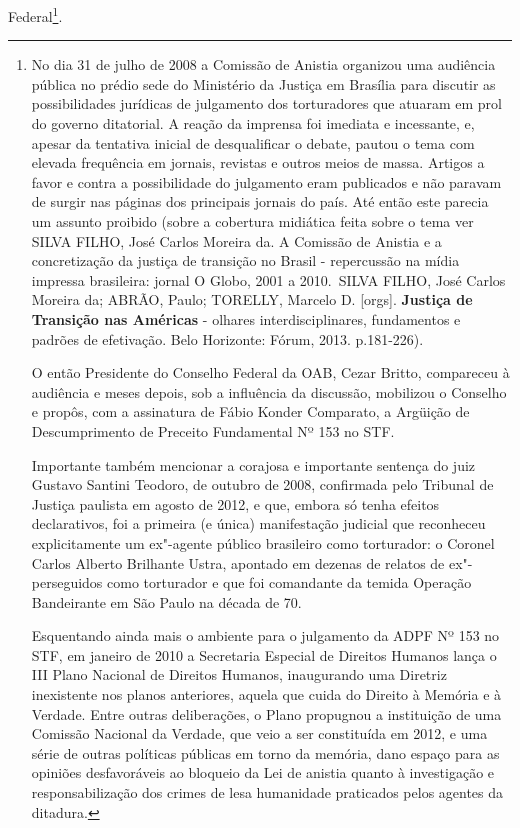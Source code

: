 Federal\footnote{No dia 31 de julho de 2008 a Comissão de Anistia
  organizou uma audiência pública no prédio sede do Ministério da
  Justiça em Brasília para discutir as possibilidades jurídicas de
  julgamento dos torturadores que atuaram em prol do governo ditatorial.
  A reação da imprensa foi imediata e incessante, e, apesar da tentativa
  inicial de desqualificar o debate, pautou o tema com elevada
  frequência em jornais, revistas e outros meios de massa. Artigos a
  favor e contra a possibilidade do julgamento eram publicados e não
  paravam de surgir nas páginas dos principais jornais do país. Até
  então este parecia um assunto proibido (sobre a cobertura midiática
  feita sobre o tema ver SILVA FILHO, José Carlos Moreira da. A Comissão
  de Anistia e a concretização da justiça de transição no Brasil -
  repercussão na mídia impressa brasileira: jornal O Globo, 2001 a
  2010.~SILVA FILHO, José Carlos Moreira da; ABRÃO, Paulo; TORELLY,
  Marcelo D. {[}orgs{]}. \textbf{Justiça de Transição nas Américas} -
  olhares interdisciplinares, fundamentos e padrões de efetivação. Belo
  Horizonte: Fórum, 2013. p.181-226).

  O então Presidente do Conselho Federal da OAB, Cezar Britto,
  compareceu à audiência e meses depois, sob a influência da discussão,
  mobilizou o Conselho e propôs, com a assinatura de Fábio Konder
  Comparato, a Argüição de Descumprimento de Preceito Fundamental Nº 153
  no STF.

  Importante também mencionar a corajosa e importante sentença do juiz
  Gustavo Santini Teodoro, de outubro de 2008, confirmada pelo Tribunal
  de Justiça paulista em agosto de 2012, e que, embora só tenha efeitos
  declarativos, foi a primeira (e única) manifestação judicial que
  reconheceu explicitamente um ex"-agente público brasileiro como
  torturador: o Coronel Carlos Alberto Brilhante Ustra, apontado em
  dezenas de relatos de ex"-perseguidos como torturador e que foi
  comandante da temida Operação Bandeirante em São Paulo na década de
  70.

  Esquentando ainda mais o ambiente para o julgamento da ADPF Nº 153 no
  STF, em janeiro de 2010 a Secretaria Especial de Direitos Humanos
  lança o III Plano Nacional de Direitos Humanos, inaugurando uma
  Diretriz inexistente nos planos anteriores, aquela que cuida do
  Direito à Memória e à Verdade. Entre outras deliberações, o Plano
  propugnou a instituição de uma Comissão Nacional da Verdade, que veio
  a ser constituída em 2012, e uma série de outras políticas públicas em
  torno da memória, dano espaço para as opiniões desfavoráveis ao
  bloqueio da Lei de anistia quanto à investigação e responsabilização
  dos crimes de lesa humanidade praticados pelos agentes da ditadura.}.

